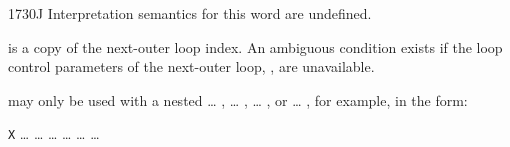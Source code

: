 \begin{worddef}{1730}{J}
\interpret
	Interpretation semantics for this word are undefined.

\execute

	 is a copy of the next-outer loop index. An
	ambiguous condition exists if the loop control parameters of
	the next-outer loop, , are unavailable.

	\begin{rationale} %
		 may only be used with a nested
		 {\ldots} ,
		 {\ldots} ,
		 {\ldots} , or
		 {\ldots} ,
		for example, in the form:

		\tab \word{:} \texttt{X}
			{\ldots} 
				{\ldots} 
					{\ldots}  {\ldots}
			{\ldots} 
		{\ldots} \word{;}
	\end{rationale}

	\begin{testing} %
		 \\
		 \\
		 \\

		 \\
		 \\
		 \\
	\end{testing}
\end{worddef}

